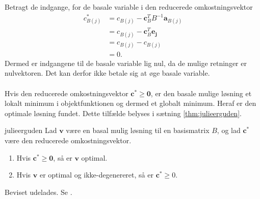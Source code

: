 %
Betragt de indgange, for de basale variable i den reducerede omkostningsvektor
%
\begin{align*}
c^*_{B(j)} & = c_{B(j)} - \mathbf{c}_B^T B^{-1} \mathbf{a}_{B(j)} \\
& = c_{B(j)} - \mathbf{c}_B^T \mathbf{e_j} \\
& = c_{B(j)} -  c_{B(j)}  \\
& = 0.
\end{align*}
%
Dermed er indgangene til de basale variable lig nul, da de mulige retninger er nulvektoren. 
Det kan derfor ikke betale sig at øge basale variable.
\\\\
Hvis den reducerede omkostningsvektor $\mathbf{c}^* \geq \mathbf{0}$, er den basale mulige løsning et lokalt minimum i objektfunktionen og dermed et globalt minimum. Heraf er den optimale løsning fundet. Dette tilfælde belyses i sætning \ref{thm:julieerguden}.
%
\begin{thm}{}{julieerguden}
Lad $\mathbf{v}$ være en basal mulig løsning til en basismatrix $B$, og lad $\mathbf{c}^*$ være den reducerede omkostningsvektor. 
\begin{enumerate}[label = (\alph*)]
\item Hvis $\mathbf{c}^* \geq \textbf{0}$, så er $\mathbf{v}$ optimal.
\item Hvis $\mathbf{v}$ er optimal og ikke-degenereret, så er $\mathbf{c}^* \geq 0$.
\end{enumerate}
\end{thm}
\noindent
%
Beviset udelades.
Se \citep[Side 86]{bert}.\\\\
